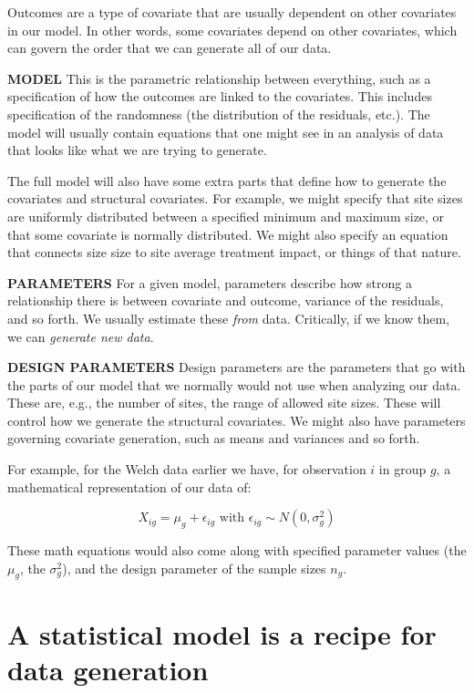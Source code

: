 \documentclass[
]{book}
\begin{document}
Outcomes are a type of covariate that are usually dependent on other covariates in our model.
In other words, some covariates depend on other covariates, which can govern the order that we can generate all of our data.

\textbf{MODEL}
This is the parametric relationship between everything, such as a specification of how the outcomes are linked to the covariates.
This includes specification of the randomness (the distribution of the residuals, etc.).
The model will usually contain equations that one might see in an analysis of data that looks like what we are trying to generate.

The full model will also have some extra parts that define how to generate the covariates and structural covariates.
For example, we might specify that site sizes are uniformly distributed between a specified minimum and maximum size, or that some covariate is normally distributed.
We might also specify an equation that connects size size to site average treatment impact, or things of that nature.

\textbf{PARAMETERS}
For a given model, parameters describe how strong a relationship there is between covariate and outcome, variance of the residuals, and so forth.
We usually estimate these \emph{from} data.
Critically, if we know them, we can \emph{generate new data}.

\textbf{DESIGN PARAMETERS}
Design parameters are the parameters that go with the parts of our model that we normally would not use when analyzing our data.
These are, e.g., the number of sites, the range of allowed site sizes.
These will control how we generate the structural covariates.
We might also have parameters governing covariate generation, such as means and variances and so forth.

For example, for the Welch data earlier we have, for observation \(i\) in group \(g\), a mathematical representation of our data of:

\[ X_{ig} = \mu_g + \epsilon_{ig} \mbox{ with } \epsilon_{ig} \sim N( 0, \sigma^2_g ) \]

These math equations would also come along with specified parameter values (the \(\mu_g\), the \(\sigma^2_g\)), and the design parameter of the sample sizes \(n_g\).

\section{A statistical model is a recipe for data generation}\label{a-statistical-model-is-a-recipe-for-data-generation}
\end{document}
